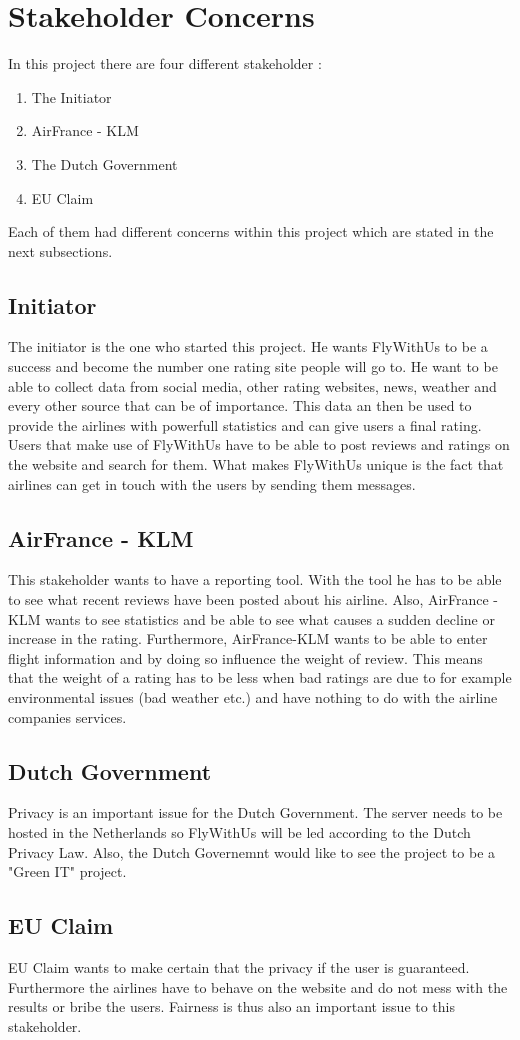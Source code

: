 \section{Stakeholder Concerns}

In this project there are four different stakeholder :
\begin{enumerate}
\item The Initiator
\item AirFrance - KLM
\item The Dutch Government
\item EU Claim
\end{enumerate}

Each of them had different concerns within this project which are stated in the next subsections.

\subsection{Initiator}
The initiator is the one who started this project. He wants FlyWithUs to be a success and become the number one rating site people will go to. He want to be able to collect data from social media, other rating websites, news, weather and every other source that can be of importance. This data an then be used to provide the airlines with powerfull statistics and can give users a final rating. Users that make use of FlyWithUs have to be able to post reviews and ratings on the website and search for them. What makes FlyWithUs unique is the fact that airlines can get in touch with the users by sending them messages.

\subsection{AirFrance - KLM}
This stakeholder wants to have a reporting tool. With the tool he has to be able to see what recent reviews have been posted about his airline. Also, AirFrance - KLM wants to see statistics and be able to see what causes a sudden decline or increase in the rating. Furthermore, AirFrance-KLM wants to be able to enter flight information and by doing so influence the weight of review. This means that the weight of a rating has to be less when bad ratings are due to for example environmental issues (bad weather etc.) and have nothing to do with the airline companies services.

\subsection{Dutch Government}
Privacy is an important issue for the Dutch Government. The server needs to be hosted in the Netherlands so FlyWithUs will be led according to the Dutch Privacy Law. Also, the Dutch Governemnt would like to see the project to be a "Green IT" project. 

\subsection{EU Claim}
EU Claim wants to make certain that the privacy if the user is guaranteed. Furthermore the airlines have to behave on the website and do not mess with the results or bribe the users. Fairness is thus also an important issue to this stakeholder.